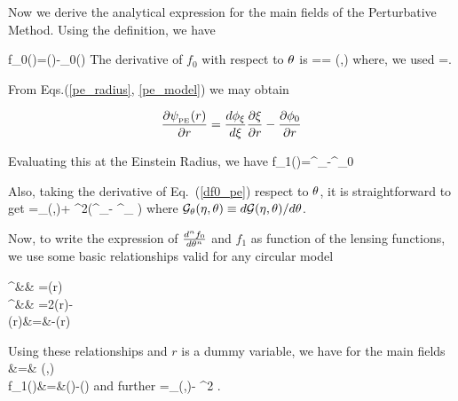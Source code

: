 Now we derive the analytical expression for the main fields of the
Perturbative Method. Using the definition, we have

\beq
f_0(\te)=\phi(\xer)-\phi_0(\re)
\eeq
The derivative of $f_0$ with respect to $\theta$ is
\beq
{}==
\dfrac{\phi^\prime_{\xer}}{\xer}\scriptg(\eta,\te)
\label{df0_pe}
\eeq
where, we used 
\beq
{}=\dfrac{\scriptg(\eta,\te)}{\xer}.                
\label{dxer_pe}
\eeq

From Eqs.{(\ref{pe_radius}, \ref{pe_model})} we may obtain 

\begin{equation*}
\dfrac{\partial \psi_{_{\mathrm{PE}}}(r) }{\partial
r}=\dfrac{d\phi_\xi}{d\xi}\dfrac{\partial \xi}{\partial r}-\dfrac{\partial \phi_0}{\partial
r}
\end{equation*}

Evaluating this at the Einstein Radius, we have
\beq
f_1(\te)=\dfrac{\xer}{\re}\phi^\prime_{\xer}-\phi^\prime_0
\label{f1_pe}
\eeq

Also, taking the derivative of Eq.~(\ref{df0_pe}) respect to $\theta$, it is
straightforward to get
\beq
{}=\scriptg_\te(\eta,\te)\dfrac{\phi^\prime_{\xer
}}{\xer}+%
\left[
\dfrac{\scriptg(\eta,\te)}{\xer}\right]^2\left(\phi^{\prime\prime}_{\xer}-\dfrac
{\phi^{\prime}_{\xer}}{\xer}  \right)
\label{ddf0_pe}
\eeq
where $\mathcal{G}_\theta(\eta,\theta)\equiv d\mathcal{G}(\eta,\theta)/d\theta$.

Now, to write the expression of $d^nf_0 \over d\theta^n$ and $f_1$ as function of
the lensing functions, we use some basic relationships valid for
any circular model

\bea
\phi^\prime &\equiv& =\alpha(r) \label{dphi}\\
\phi^{\prime\prime}&\equiv& =2\kappa(r)-\label{ddphi}\\
\gamma(r)&=&-\kappa(r) \label{shear_gen}
\eea

Using these relationships and $r$ is a dummy variable, we have for the main
fields
\bea
{}&=& \dfrac{\alpha(\xer)}{\xer}\scriptg(\eta,\te)
\label{df0_pe2}\\
f_1(\te)&=&\dfrac{\xer}{\re}\alpha(\xer)-\alpha(\re) \label{f1_pe2}
\eea
and further
\beq
\label{ddf0_pe2}
=\scriptg_\te(\eta,\te)\dfrac{\alpha(\xer)}{
\xer}-%
\left[ \dfrac{\scriptg(\eta,\te)}{\xer}\right]^2 .
\eeq

